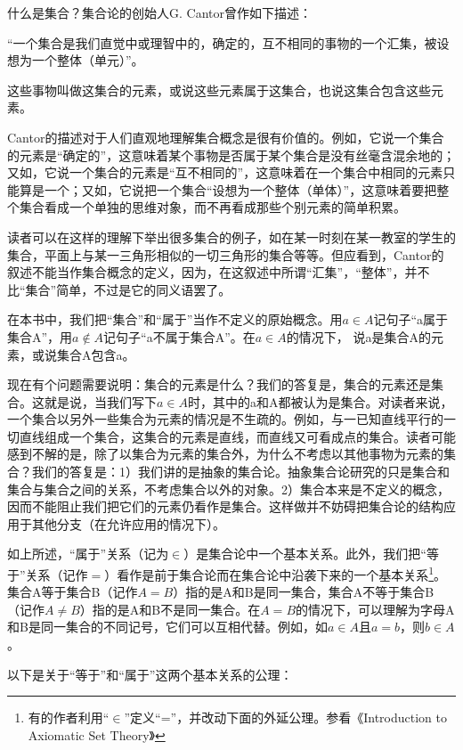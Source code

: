 什么是集合？集合论的创始人G. Cantor曾作如下描述：

“一个集合是我们直觉中或理智中的，确定的，互不相同的事物的一个汇集，被设想为一个整体（单元）”。

这些事物叫做这集合的元素，或说这些元素属于这集合，也说这集合包含这些元素。

Cantor的描述对于人们直观地理解集合概念是很有价值的。例如，它说一个集合的元素是“确定的”，这意味着某个事物是否属于某个集合是没有丝毫含混余地的；又如，它说一个集合的元素是“互不相同的”，这意味着在一个集合中相同的元素只能算是一个；又如，它说把一个集合“设想为一个整体（单体）”，这意味着要把整个集合看成一个单独的思维对象，而不再看成那些个别元素的简单积累。

读者可以在这样的理解下举出很多集合的例子，如在某一时刻在某一教室的学生的集合，平面上与某一三角形相似的一切三角形的集合等等。但应看到，Cantor的叙述不能当作集合概念的定义，因为，在这叙述中所谓“汇集”，“整体”，并不比“集合”简单，不过是它的同义语罢了。

在本书中，我们把“集合”和“属于”当作不定义的原始概念。用$a \in A$记句子“a属于集合A”，用$a \notin A$记句子“a不属于集合A”。在$a \in A$的情况下， 说a是集合A的元素，或说集合A包含a。

现在有个问题需要说明：集合的元素是什么？我们的答复是，集合的元素还是集合。这就是说，当我们写下$a \in A$时，其中的a和A都被认为是集合。对读者来说，一个集合以另外一些集合为元素的情况是不生疏的。例如，与一已知直线平行的一切直线组成一个集合，这集合的元素是直线，而直线又可看成点的集合。读者可能感到不解的是，除了以集合为元素的集合外，为什么不考虑以其他事物为元素的集合？我们的答复是：1）我们讲的是抽象的集合论。抽象集合论研究的只是集合和集合与集合之间的关系，不考虑集合以外的对象。2）集合本来是不定义的概念，因而不能阻止我们把它们的元素仍看作是集合。这样做并不妨碍把集合论的结构应用于其他分支（在允许应用的情况下）。

如上所述，“属于”关系（记为$\in$）是集合论中一个基本关系。此外，我们把“等于”关系（记作$=$）看作是前于集合论而在集合论中沿袭下来的一个基本关系\footnote{有的作者利用“$\in$”定义“=”，并改动下面的外延公理。参看《Introduction to Axiomatic Set Theory》}。集合A等于集合B（记作$A=B$）指的是A和B是同一集合，集合A不等于集合B（记作$A \neq B$）指的是A和B不是同一集合。在$A = B$的情况下，可以理解为字母A和B是同一集合的不同记号，它们可以互相代替。例如，如$a \in A$且$a = b$，则$b \in A$。

以下是关于“等于”和“属于”这两个基本关系的公理：


